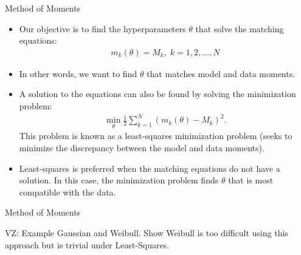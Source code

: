 \documentclass[9pt]{beamer}
\begin{document}
\begin{frame}{Method of Moments}

\begin{itemize}

\item Our objective is to find the hyperparameters $\theta$ that solve the matching equations:
\begin{align*}
m_k(\theta)=M_k,\; k=1,2,...,N
\end{align*}
\item In other words, we want to find $\theta$ that matches model and data moments. 

\item A solution to the equations can also be found by solving the minimization problem:
\begin{align*}
\min_\theta \frac{1}{2}\sum_{k=1}^N(m_k(\theta)-M_k)^2.
\end{align*}
This problem is known as a least-squares minimization problem (seeks to minimize the discrepancy between the model and data moments). 

\item Least-squares is preferred when the matching equations do not have a solution. In this case, the minimization problem finds $\theta$ that is most compatible with the data.  

\end{itemize}

\end{frame}


%
\begin{frame}{Method of Moments}

\begin{block}{}
{\color{red} VZ: Example Gaussian and Weibull. Show Weibull is too difficult using this approach but is trivial under Least-Squares.}
\end{block}

\end{frame}
\end{document}
